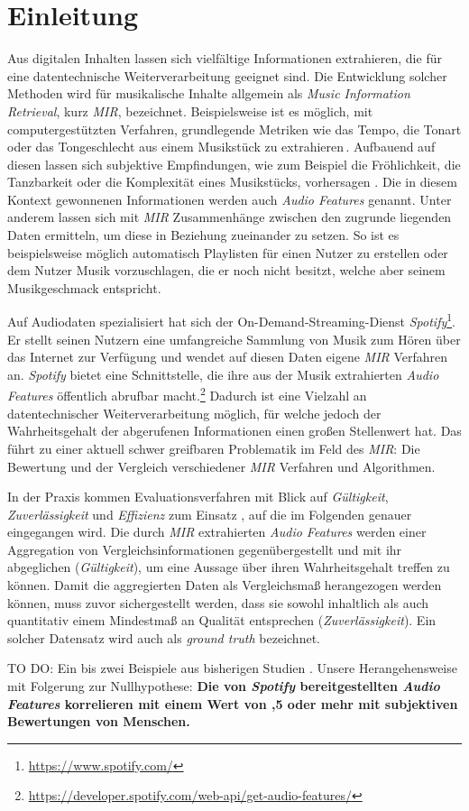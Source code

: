 \section*{Einleitung}
\label{sec:Einleitung}
Aus digitalen Inhalten lassen sich vielfältige Informationen extrahieren, die für eine datentechnische Weiterverarbeitung geeignet sind.
Die Entwicklung solcher Methoden wird für musikalische Inhalte allgemein als \textit{Music Information Retrieval}, kurz \textit{MIR}, bezeichnet.
Beispielsweise ist es möglich, mit computergestützten Verfahren, grundlegende Metriken wie das Tempo, die Tonart oder das Tongeschlecht aus einem Musikstück zu extrahieren\,\cite{Casey2008}.
Aufbauend auf diesen lassen sich subjektive Empfindungen, wie zum Beispiel die Fröhlichkeit, die Tanzbarkeit oder die Komplexität eines Musikstücks, vorhersagen \cite{Sturm2013}.
Die in diesem Kontext gewonnenen Informationen werden auch \textit{Audio Features} genannt.
Unter anderem lassen sich mit \textit{MIR} Zusammenhänge zwischen den zugrunde liegenden Daten ermitteln, um diese in Beziehung zueinander zu setzen.
So ist es beispielsweise möglich automatisch Playlisten für einen Nutzer zu erstellen oder dem Nutzer Musik vorzuschlagen, die er noch nicht besitzt, welche aber seinem Musikgeschmack entspricht. %

Auf Audiodaten spezialisiert hat sich der On-Demand-Streaming-Dienst \textit{Spotify}\footnote{\url{https://www.spotify.com/}}.
Er stellt seinen Nutzern eine umfangreiche Sammlung von Musik zum Hören über das Internet zur Verfügung und wendet auf diesen Daten eigene \textit{MIR} Verfahren an.
\textit{Spotify} bietet eine Schnittstelle, die ihre aus der Musik extrahierten \textit{Audio Features} öffentlich abrufbar macht.\footnote{\url{https://developer.spotify.com/web-api/get-audio-features/}}
Dadurch ist eine Vielzahl an datentechnischer Weiterverarbeitung möglich, für welche jedoch der Wahrheitsgehalt der abgerufenen Informationen einen großen Stellenwert hat.
Das führt zu einer aktuell schwer greifbaren Problematik im Feld des \textit{MIR}:
Die Bewertung und der Vergleich verschiedener \textit{MIR} Verfahren und Algorithmen.

In der Praxis kommen Evaluationsverfahren mit Blick auf \textit{Gültigkeit}, \textit{Zuverlässigkeit} und \textit{Effizienz} zum Einsatz \cite{Downie2004}, auf die im Folgenden genauer eingegangen wird.
Die durch \textit{MIR} extrahierten \textit{Audio Features} werden einer Aggregation von Vergleichsinformationen gegenübergestellt und mit ihr abgeglichen (\textit{Gültigkeit}), um eine Aussage über ihren Wahrheitsgehalt treffen zu können.
Damit die aggregierten Daten als Vergleichsmaß herangezogen werden können, muss zuvor sichergestellt werden, dass sie sowohl inhaltlich als auch quantitativ einem Mindestmaß an Qualität entsprechen (\textit{Zuverlässigkeit}).
Ein solcher Datensatz wird auch als \textit{ground truth} bezeichnet.


TO DO:
Ein bis zwei Beispiele aus bisherigen Studien 
\cite{Urbano_2013}.
Unsere Herangehensweise mit Folgerung zur Nullhypothese:
\textbf{Die von \textit{Spotify} bereitgestellten \textit{Audio Features} korrelieren mit einem Wert von ,5 oder mehr mit subjektiven Bewertungen von Menschen.}
